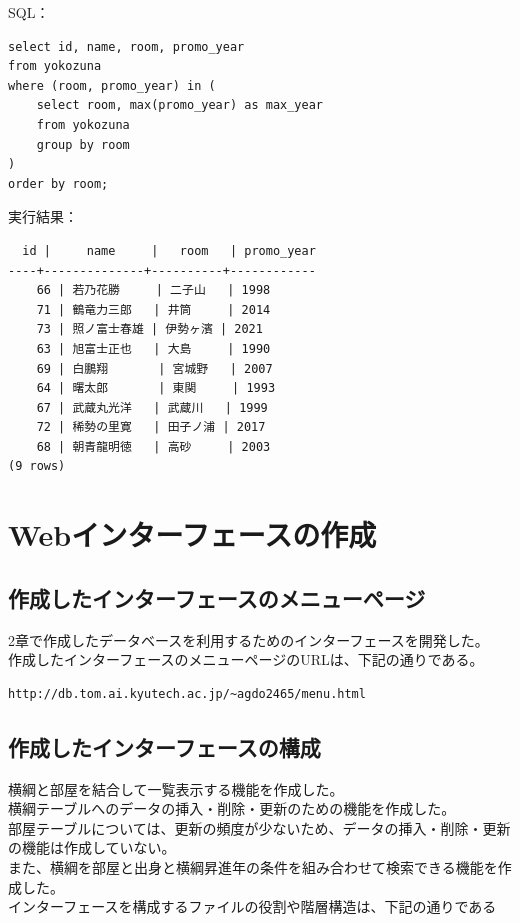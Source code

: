 \documentclass[10pt,a4paper,titlepage]{jreport}
\begin{document}
SQL：
\begin{verbatim}
select id, name, room, promo_year
from yokozuna 
where (room, promo_year) in (
	select room, max(promo_year) as max_year
	from yokozuna
	group by room
)
order by room;
\end{verbatim}

実行結果：
\begin{verbatim}
  id |     name     |   room   | promo_year
----+--------------+----------+------------
	66 | 若乃花勝     | 二子山   | 1998
	71 | 鶴竜力三郎   | 井筒     | 2014
	73 | 照ノ富士春雄 | 伊勢ヶ濱 | 2021
	63 | 旭富士正也   | 大島     | 1990
	69 | 白鵬翔       | 宮城野   | 2007
	64 | 曙太郎       | 東関     | 1993
	67 | 武蔵丸光洋   | 武蔵川   | 1999
	72 | 稀勢の里寛   | 田子ノ浦 | 2017
	68 | 朝青龍明徳   | 高砂     | 2003
(9 rows)
\end{verbatim}


\chapter{Webインターフェースの作成}

\section{作成したインターフェースのメニューページ}



2章で作成したデータベースを利用するためのインターフェースを開発した。\\
作成したインターフェースのメニューページのURLは、下記の通りである。

\begin{verbatim}
http://db.tom.ai.kyutech.ac.jp/~agdo2465/menu.html
\end{verbatim}


\section{作成したインターフェースの構成}

横綱と部屋を結合して一覧表示する機能を作成した。\\
横綱テーブルへのデータの挿入・削除・更新のための機能を作成した。\\
部屋テーブルについては、更新の頻度が少ないため、データの挿入・削除・更新の機能は作成していない。\\
また、横綱を部屋と出身と横綱昇進年の条件を組み合わせて検索できる機能を作成した。\\
インターフェースを構成するファイルの役割や階層構造は、下記の通りである
\end{document}
